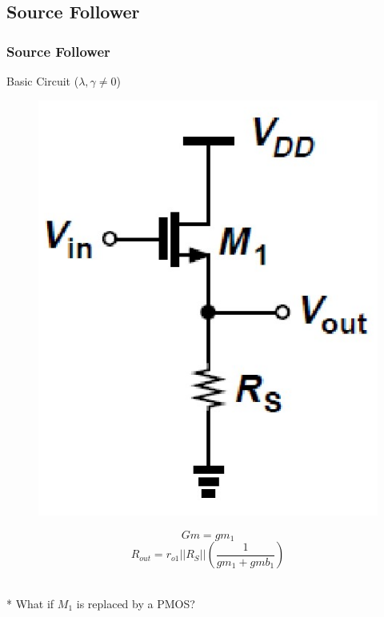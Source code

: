 \documentclass{beamer}
\begin{document}
\subsection{Source Follower}
\begin{frame}
    \frametitle{Source Follower}
    \begin{minipage}{0.45\linewidth}
        Basic Circuit ($\lambda, \gamma\not= 0$)
        \begin{figure}[H]
            \centering
            \includegraphics[width=0.8\linewidth]{source-follower-R.png}
        \end{figure}
         
    \end{minipage}
    \begin{minipage}{0.5\linewidth}
        \begin{equation*}
            Gm = gm_1 
        \end{equation*}
        \begin{equation*}
                R_{out} = r_{o1}||R_S||(\frac{1}{gm_1+gmb_1})
        \end{equation*}
    \end{minipage}\\
    * What if $M_1$ is replaced by a PMOS?%
\end{frame}
\end{document}
